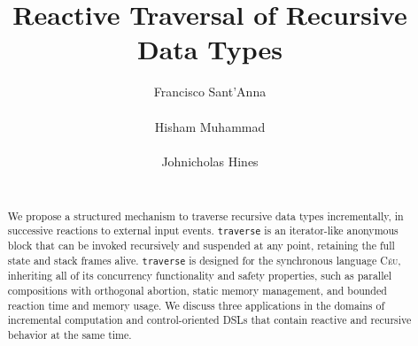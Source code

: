 \documentclass{sig-alternate}
\newcommand{\CEU}{\textsc{C\'{e}u}\xspace}
\newcommand{\code}[1] {{\small{\texttt{#1}}}}
\begin{document}
\title{Reactive Traversal of Recursive Data Types}

\author{
\alignauthor
Francisco Sant'Anna \\
     \\
\alignauthor
Hisham Muhammad \\
     \\
\alignauthor
Johnicholas Hines \\
     \\
}

\maketitle
\begin{abstract}
We propose a structured mechanism to traverse recursive data types 
incrementally, in successive reactions to external input events.
\code{traverse} is an iterator-like anonymous block that can be invoked 
recursively and suspended at any point, retaining the full state and stack 
frames alive.
\code{traverse} is designed for the synchronous language \CEU, inheriting all 
of its concurrency functionality and safety properties, such as parallel 
compositions with orthogonal abortion, static memory management, and bounded 
reaction time and memory usage.
We discuss three applications in the domains of incremental computation and 
control-oriented DSLs that contain reactive and recursive behavior at the same 
time.

\end{abstract}
\end{document}
